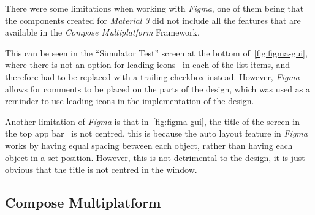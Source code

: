 \documentclass[../dissertation.tex]{subfiles}
\begin{document}
There were some limitations when working with \textit{Figma}, one of them being that
the components created for \textit{Material 3} did not include all the features that are
available in the \textit{Compose Multiplatform} Framework.

This can be seen in the \enquote{Simulator Test} screen at the bottom of~\autoref{fig:figma-gui},
where there is not an option for leading icons~\cite{material:lists} in each of the list items,
and therefore had to be replaced with a trailing checkbox instead. However, \textit{Figma}
allows for comments to be placed on the parts of the design, which was used as a reminder
to use leading icons in the implementation of the design.

Another limitation of \textit{Figma} is that in~\autoref{fig:figma-gui}, the title of the screen
in the top app bar~\cite{material:top-app-bar} is not centred, this is because
the auto layout feature in \textit{Figma} works by having equal spacing between each
object, rather than having each object in a set position. However, this is
not detrimental to the design, it is just obvious that the title is not centred in the
window.


\subsection{Compose Multiplatform}
\end{document}
